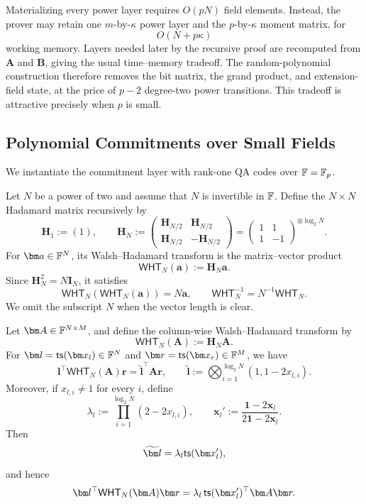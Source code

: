 \documentclass[runningheads]{llncs}
\begin{document}
Materializing every power layer requires \(O(pN)\) field elements.
Instead, the prover may retain one \(m\)-by-\(\kappa\) power layer and
the \(p\)-by-\(\kappa\) moment matrix, for
\begin{equation}
    O(N+p\kappa)
\label{eq:packed-permutation-streaming-memory}
\end{equation}
working memory.  Layers needed later by the recursive proof are
recomputed from \(\bm A\) and \(\bm B\), giving the usual time--memory
tradeoff.  The random-polynomial construction therefore removes the
bit matrix, the grand product, and extension-field state, at the price
of \(p-2\) degree-two power transitions.  This tradeoff is attractive
precisely when \(p\) is small.

\subsection{Polynomial Commitments over Small Fields}
\label{sec:pcs-small-field}

We instantiate the commitment layer with rank-one QA codes over
\({\mathbb{F}}=\mathbb F_p\).

\begin{definition}
Let \(N\) be a power of two and assume that \(N\) is invertible in
\({\mathbb{F}}\).  Define the \(N\times N\) Hadamard matrix recursively by
\[
    \bm H_1:=(1),
    \qquad
    \bm H_N
    :=
    \begin{pmatrix}
        \bm H_{N/2} & \bm H_{N/2}\\
        \bm H_{N/2} & -\bm H_{N/2}
    \end{pmatrix}
    =
    \begin{pmatrix}
        1&1\\
        1&-1
    \end{pmatrix}^{\otimes\log_2N}.
\]
For \(\bm a\in\Field^N\), its Walsh--Hadamard transform is the matrix--vector
product
\[
    \mathsf{WHT}_N(\bm a):=\bm H_N\bm a.
\]
Since \(\bm H_N^2=N\bm I_N\), it satisfies
\[
    \mathsf{WHT}_N(\mathsf{WHT}_N(\bm a))=N\bm a,
    \qquad
    \mathsf{WHT}_N^{-1}=N^{-1}\mathsf{WHT}_N.
\]
We omit the subscript \(N\) when the vector length is clear.
\end{definition}

\begin{lemma}
\label{lemma:wht-mle}
Let \(\bm A\in\Field^{N\times M}\), and define the column-wise
Walsh--Hadamard transform by
\[
    \mathsf{WHT}_N(\bm A):=\bm H_N\bm A.
\]
For
\(
    \bm l=\tensorspan{\bm x_l}\in\Field^N
\)
and
\(
    \bm r=\tensorspan{\bm x_r}\in\Field^M
\),
we have
\[
    \bm l^\top\mathsf{WHT}_N(\bm A)\bm r
    =
    \widetilde{\bm l}^{\top}\bm A\bm r,
    \qquad
    \widetilde{\bm l}
    :=
    \bigotimes_{i=1}^{\log_2N}(1,1-2x_{l,i}).
\]
Moreover, if \(x_{l,i}\ne1\) for every \(i\), define
\[
    \lambda_l
    :=
    \prod_{i=1}^{\log_2N}(2-2x_{l,i}),
    \qquad
    \bm x_l'
    :=
    \frac{\bm{1}-2\bm x_l}{2\bm{1}-2\bm x_l}.
\]
Then
\[
    \widetilde{\bm l}
    =
    \lambda_l\tensorspan{\bm x_l'},
\]
and hence
\[
    \bm l^\top\mathsf{WHT}_N(\bm A)\bm r
    =
    \lambda_l\,
    \tensorspan{\bm x_l'}^\top\bm A\bm r.
\]
\end{lemma}
\end{document}
